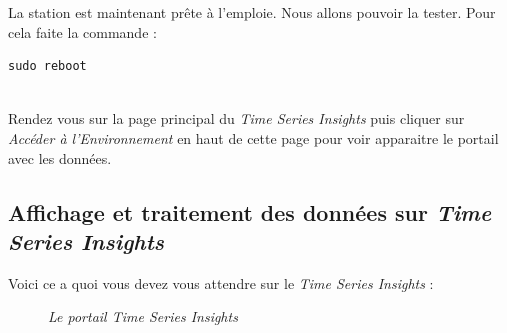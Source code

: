 La station est maintenant prête à l'emploie. Nous allons pouvoir la tester. Pour cela faite la commande :\\

\begin{lstlisting}[style=MyBashStyle]
	sudo reboot
\end{lstlisting}\\

Rendez vous sur la page principal du \textit{Time Series Insights} puis cliquer sur \textit{Accéder à l'Environnement} en haut de cette page pour voir apparaitre le portail avec les données.

\subsection{Affichage et traitement des données sur \textit{Time Series Insights}}

Voici ce a quoi vous devez vous attendre sur le \textit{Time Series Insights} : \\

\begin{figure}[H]
\begin{center}
\end{center}
	\caption{ \textit{Le portail \textit{Time Series Insights}}}
\end{figure}\\

